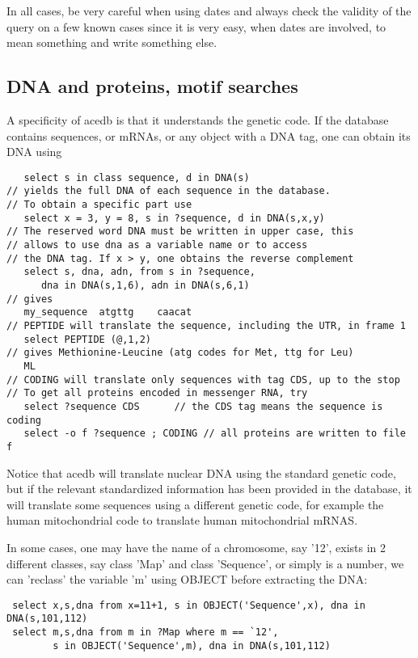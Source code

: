 \documentclass[11pt]{article}
\newcommand{\BL}{\begin{lstlisting}}
\begin{document}
In all cases, be very careful when using dates and always check the validity of the query on a few known cases
since it is very easy, when dates are involved, to mean something and write something else.

%%%%%%%%%%%%%%%%%%%%%%%%%%%%%%%%%%%%%%%%%%%%%%%%%%%%%%%%%%%%%%%%
% SECTION
%%%%%%%%%%%%%%%%%%%%%%%%%%%%%%%%%%%%%%%%%%%%%%%%%%%%%%%%%%%%%%%%
\subsection{DNA and proteins, motif searches}

A specificity of acedb is that it understands the genetic code. If the database 
contains sequences, or mRNAs, 
or any object with a DNA tag, one can obtain its DNA using
\BL
   select s in class sequence, d in DNA(s)
// yields the full DNA of each sequence in the database. 
// To obtain a specific part use
   select x = 3, y = 8, s in ?sequence, d in DNA(s,x,y)   
// The reserved word DNA must be written in upper case, this
// allows to use dna as a variable name or to access 
// the DNA tag. If x > y, one obtains the reverse complement
   select s, dna, adn, from s in ?sequence, 
      dna in DNA(s,1,6), adn in DNA(s,6,1)
// gives
   my_sequence  atgttg    caacat
// PEPTIDE will translate the sequence, including the UTR, in frame 1
   select PEPTIDE (@,1,2)
// gives Methionine-Leucine (atg codes for Met, ttg for Leu)
   ML
// CODING will translate only sequences with tag CDS, up to the stop 
// To get all proteins encoded in messenger RNA, try
   select ?sequence CDS      // the CDS tag means the sequence is coding
   select -o f ?sequence ; CODING // all proteins are written to file f
\end{lstlisting}
Notice that acedb will translate nuclear DNA using the standard genetic code, 
but if the relevant standardized information has been provided in the database,
it will translate some sequences using a different genetic code,
for example the human mitochondrial code to translate human mitochondrial mRNAS.

In some cases, one may have the name of a chromosome, say '12', exists in 2 different classes,
say class 'Map' and class 'Sequence', or simply is a number, 
we can 'reclass' the  variable 'm' using OBJECT before extracting the DNA:
\BL
 select x,s,dna from x=11+1, s in OBJECT('Sequence',x), dna in DNA(s,101,112)
 select m,s,dna from m in ?Map where m == `12',
        s in OBJECT('Sequence',m), dna in DNA(s,101,112)
\end{lstlisting}
\end{document}

